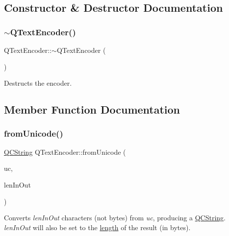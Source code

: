 \subsection{Constructor \& Destructor Documentation}
\mbox{\label{class_q_text_encoder_ad4aeae820b76fb14a7f5d411ba424b7a}} 
\subsubsection{\texorpdfstring{$\sim$QTextEncoder()}{~QTextEncoder()}}
{\footnotesize\ttfamily Q\+Text\+Encoder\+::$\sim$\+Q\+Text\+Encoder (\begin{DoxyParamCaption}{ }\end{DoxyParamCaption})\hspace{0.3cm}{\ttfamily [virtual]}}

Destructs the encoder. 

\subsection{Member Function Documentation}
\mbox{\label{class_q_text_encoder_a3b199427ee9b7f862fe65811165dbbfa}} 
\subsubsection{\texorpdfstring{fromUnicode()}{fromUnicode()}}
{\footnotesize\ttfamily \mbox{\hyperlink{class_q_c_string}{Q\+C\+String}} Q\+Text\+Encoder\+::from\+Unicode (\begin{DoxyParamCaption}\item[{const \mbox{\hyperlink{class_q_string}{Q\+String}} \&}]{uc,  }\item[{int \&}]{len\+In\+Out }\end{DoxyParamCaption})\hspace{0.3cm}{\ttfamily [pure virtual]}}

Converts {\itshape len\+In\+Out} characters (not bytes) from {\itshape uc}, producing a \mbox{\hyperlink{class_q_c_string}{Q\+C\+String}}. {\itshape len\+In\+Out} will also be set to the \mbox{\hyperlink{class_q_c_string_ac52596733e9110b778019946d73fb268}{length}} of the result (in bytes).


